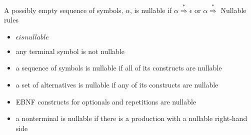 A possibly empty sequence of symbols, $\alpha$, is nullable if  $\alpha \stackrel{*}{\Rightarrow} \epsilon$ or $\alpha \stackrel{*}{\Rightarrow}$
Nullable rules
\begin{itemize}
        \item $\epsilon is nullable$
        \item any terminal symbol is not nullable
        \item a sequence of symbols is nullable if all of its constructs are nullable
        \item a set of alternatives is nullable if any of its constructs are nullable
        \item EBNF constructs for optionals and repetitions are nullable
        \item a nonterminal is nullable if there is a production with a nullable right-hand side
\end{itemize}
